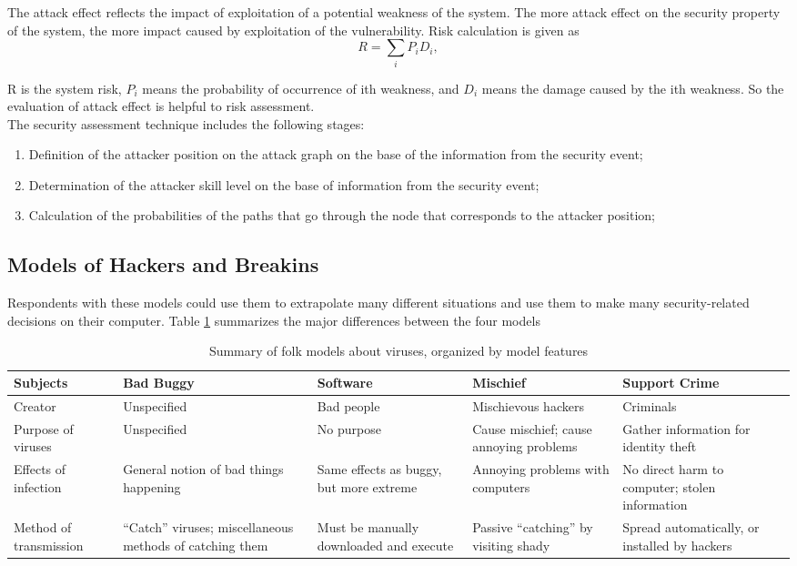 \documentclass{ledger}
\begin{document}
The attack effect reflects the impact of exploitation of a potential weakness of the system. The more attack effect on the security property of the system, the more impact caused by exploitation of the vulnerability. Risk calculation is given as
$$ R=\sum\limits_{i}  P_iD_i,$$

R is the system risk, $P_i$ means the probability of occurrence of ith weakness, and $D_i$ means the damage caused by the ith weakness. So the evaluation of attack effect is helpful to risk assessment.\\

The security assessment technique includes the following stages: 
\begin{enumerate}
    \item Definition of the attacker position on the attack graph on the base of the information from the security event;
    \item Determination of the attacker skill level on the base of information from the security event;
    \item Calculation of the probabilities of the paths that go through the node that corresponds to the attacker position;
\end{enumerate}




\subsection{Models of Hackers and Breakins}
Respondents with these models could use them to extrapolate many different situations and use them to make many security-related decisions on their computer. Table \ref{table1:data} summarizes the major differences between the four models  \\

\begin{table}[H]
\centering
\begin{tabular}{p{2cm}|p{2cm}|p{2cm}|p{2cm}|p{2cm}}
     \hline
     Subjects & Bad Buggy & Software & Mischief & Support Crime \\
     \hline
     Creator & Unspecified & Bad  people  & Mischievous hackers  & Criminals \\
     \hline
     Purpose of viruses & Unspecified & No purpose & Cause mischief; cause annoying problems & Gather information for identity theft\\
     \hline
     Effects of infection  & General notion of bad things happening & Same effects as buggy, but more extreme & Annoying problems with computers & No direct harm to computer; stolen information\\ 
     \hline
     Method of transmission & “Catch” viruses; miscellaneous methods of catching them &
     Must be manually downloaded and execute &
     Passive “catching” by visiting shady  &
     Spread automatically, or installed by hackers \\
     \hline
\end{tabular}
\caption{Summary of folk models about viruses, organized by model features}
\label{table1:data}
\end{table}
\end{document}
